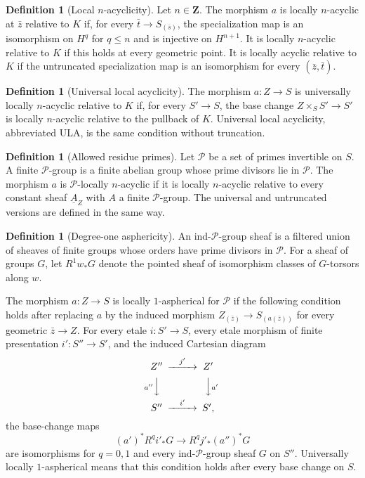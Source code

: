 \documentclass[10pt]{article}
\theoremstyle{definition}
\newtheorem{definition}[theorem]{Definition}
\begin{document}
\begin{definition}[Local $n$-acyclicity]
Let $n\in\mathbf Z$. The morphism $a$ is locally $n$-acyclic at $\bar z$
relative to $K$ if, for every $\bar t\to S_{(\bar s)}$, the specialization
map is an isomorphism on $H^q$ for $q\leq n$ and is injective on
$H^{n+1}$. It is locally $n$-acyclic relative to $K$ if this holds at every
geometric point. It is locally acyclic relative to $K$ if the untruncated
specialization map is an isomorphism for every $(\bar z,\bar t)$.
\end{definition}

\begin{definition}[Universal local acyclicity]
The morphism $a:Z\to S$ is universally locally $n$-acyclic relative to $K$
if, for every $S'\to S$, the base change
$Z\times_SS'\to S'$ is locally $n$-acyclic relative to the pullback of $K$.
Universal local acyclicity, abbreviated ULA, is the same condition without
truncation.
\end{definition}

\begin{definition}[Allowed residue primes]
Let $\mathcal P$ be a set of primes invertible on $S$. A finite
$\mathcal P$-group is a finite abelian group whose prime divisors lie in
$\mathcal P$. The morphism $a$ is $\mathcal P$-locally $n$-acyclic if it is
locally $n$-acyclic relative to every constant sheaf $\underline A_Z$ with
$A$ a finite $\mathcal P$-group. The universal and untruncated versions are
defined in the same way.
\end{definition}

\begin{definition}[Degree-one asphericity]
An ind-$\mathcal P$-group sheaf is a filtered union of sheaves of finite
groups whose orders have prime divisors in $\mathcal P$. For a sheaf of
groups $G$, let $R^1w_*G$ denote the pointed sheaf of isomorphism classes of
$G$-torsors along $w$.

The morphism $a:Z\to S$ is locally $1$-aspherical for $\mathcal P$ if the
following condition holds after replacing $a$ by the induced morphism
$Z_{(\bar z)}\to S_{(a(\bar z))}$ for every geometric $\bar z\to Z$. For
every etale $i:S'\to S$, every etale morphism of finite presentation
$i':S''\to S'$, and the induced Cartesian diagram
\[
\begin{CD}
 Z'' @>{j'}>> Z'\\
 @V{a''}VV @VV{a'}V\\
 S'' @>{i'}>> S',
\end{CD}
\]
the base-change maps
\[
 (a')^*R^qi'_*G\longrightarrow R^qj'_*(a'')^*G
\]
are isomorphisms for $q=0,1$ and every ind-$\mathcal P$-group sheaf $G$ on
$S''$. Universally locally $1$-aspherical means that this condition holds
after every base change on $S$.
\end{definition}
\end{document}
